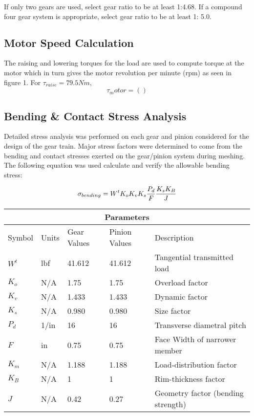 \documentclass[letterpaper,12pt]{article}
\begin{document}
\noindent If only two gears are used, select gear ratio to be at least 1:4.68. If a compound four gear system is appropriate, select gear ratio to be at least 1: 5.0.

\subsection{Motor Speed Calculation}
The raising and lowering torques for the load are used to compute torque at the motor which in turn gives the motor revolution per minute (rpm) as seen in figure 1. For $\tau_{raise} = 79.5 Nm$, 
$$\tau_motor = ()$$
\subsection{Bending \& Contact Stress Analysis}

Detailed stress analysis was performed on each gear and pinion considered for the design of the gear train. Major stress factors were determined to come from the bending and contact stresses exerted on the gear/pinion system during meshing. The following equation was used calculate and verify the allowable bending stress:

\begin{equation}
\sigma_{bending} = W^t K_o K_v K_s \frac{P_d}{F}\frac{K_s K_B}{J} \\
\end{equation}

\begin{center}
	\begin{tabular}{ |p{2cm}||p{2cm}|p{2.3cm}|p{2.3cm}|p{6cm}|  }
		\hline
		\multicolumn{5}{|c|}{Parameters} \\
		\hline
		Symbol & Units & Gear Values & Pinion Values & Description\\
		\hline
		$W^t$ & lbf & 41.612 & 41.612 & Tangential transmitted load\\
		$K_o$ & N/A & 1.75 & 1.75 & Overload factor\\
		$K_v$ & N/A & 1.433 & 1.433 & Dynamic factor\\
		$K_s$ & N/A & 0.980 & 0.980 & Size factor\\
		$P_{d}$ & 1/in & 16 & 16 & Transverse diametral pitch\\
		$F$ & in & 0.75 & 0.75 & Face Width of narrower member\\
		$K_m$ & N/A & 1.188 & 1.188 & Load-distribution factor\\
		$K_{B}$ & N/A & 1 & 1 & Rim-thickness factor\\
		$J$ & N/A & 0.42 & 0.27 & Geometry factor (bending strength)\\
		\hline
	\end{tabular}
\end{center}
\end{document}
